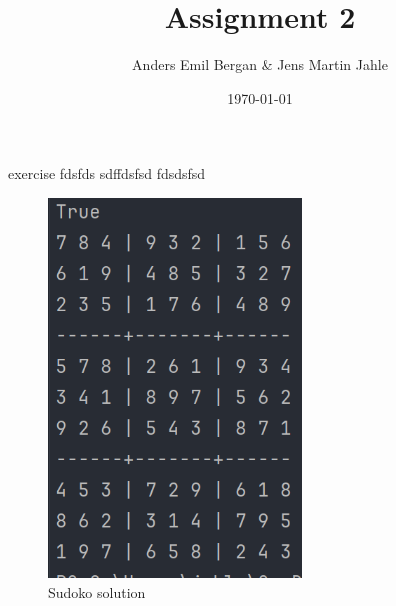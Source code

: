 \documentclass[11pt]{article}
\begin{document}
\title{Assignment 2}
\author{Anders Emil Bergan \& Jens Martin Jahle}
\date{\today}

\maketitle
{}
exercise fdsfds
sdffdsfsd
fdsdsfsd


\begin{figure}[h!]
    \centering
    \includegraphics[width=0.6\textwidth]{images/sudoko}
    \caption{Sudoko solution}
    \label{fig:example}
\end{figure}
\end{document}
